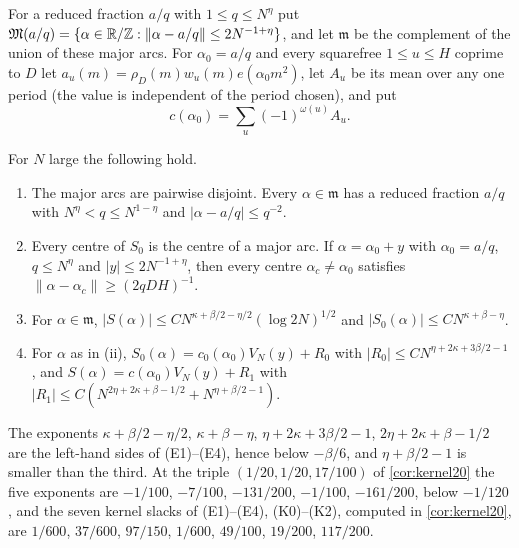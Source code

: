 For a reduced fraction $a/q$ with $1\le q\le N^\eta$ put
$\mathfrak M(a/q)=\{\alpha\in\mathbb R/\mathbb Z:\|\alpha-a/q\|\le2N^{-1+\eta}\}$, and let
$\mathfrak m$ be the complement of the union of these major arcs. For
$\alpha_0=a/q$ and every squarefree $1\le u\le H$ coprime to $D$ let
$a_u(m)=\rho_D(m)w_u(m)e(\alpha_0m^2)$, let $A_u$ be its mean over any one period (the value is independent of the period chosen),
and put
\[
 c(\alpha_0)=\sum_u(-1)^{\omega(u)}A_u .
\]

\begin{lemma}[Arcs]\label{lem:record:arcs}
For $N$ large the following hold.
\begin{enumerate}[label=(\roman*)]
\item The major arcs are pairwise disjoint. Every $\alpha\in\mathfrak m$ has a
 reduced fraction $a/q$ with $N^\eta<q\le N^{1-\eta}$ and $|\alpha-a/q|\le q^{-2}$.
\item Every centre of $S_0$ is the centre of a major arc. If $\alpha=\alpha_0+y$
 with $\alpha_0=a/q$, $q\le N^\eta$ and $|y|\le2N^{-1+\eta}$, then every centre
 $\alpha_c\ne\alpha_0$ satisfies $\|\alpha-\alpha_c\|\ge(2qDH)^{-1}$.
\item For $\alpha\in\mathfrak m$,
 $|S(\alpha)|\le CN^{\kappa+\beta/2-\eta/2}(\log2N)^{1/2}$ and
 $|S_0(\alpha)|\le CN^{\kappa+\beta-\eta}$.
\item For $\alpha$ as in (ii), $S_0(\alpha)=c_0(\alpha_0)V_N(y)+R_0$ with
 $|R_0|\le CN^{\eta+2\kappa+3\beta/2-1}$, and $S(\alpha)=c(\alpha_0)V_N(y)+R_1$
 with $|R_1|\le C(N^{2\eta+2\kappa+\beta-1/2}+N^{\eta+\beta/2-1})$.
\end{enumerate}
The exponents $\kappa+\beta/2-\eta/2$, $\kappa+\beta-\eta$,
$\eta+2\kappa+3\beta/2-1$, $2\eta+2\kappa+\beta-1/2$ are the left-hand sides of
(E1)--(E4), hence below $-\beta/6$, and $\eta+\beta/2-1$ is smaller than the
third. At the triple $(1/20,1/20,17/100)$ of \cref{cor:kernel20} the five
exponents are $-1/100$, $-7/100$, $-131/200$, $-1/100$, $-161/200$, below
$-1/120$, and the seven kernel slacks of (E1)--(E4), (K0)--(K2), computed in
\cref{cor:kernel20}, are $1/600$, $37/600$, $97/150$, $1/600$, $49/100$,
$19/200$, $117/200$.
\end{lemma}

